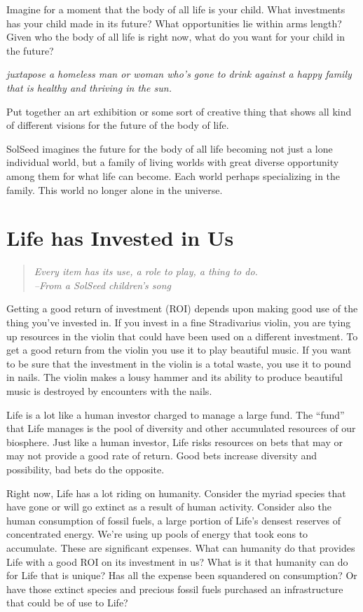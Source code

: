 \documentclass[ebook,11pt,openany,twoside]{memoir}
\newcommand{\tab}{\hspace*{2em}}
\newcommand{\imagefacingchapter}[1]{
  \cleartoverso
  \clearpage \null
  \thispagestyle{cleared}
  \AddToShipoutPictureBG*{%
    \AtStockLowerLeft{%
      \texttt{[image: \#1]}
    }
  }
  \clearpage
}
\begin{document}
Imagine for a moment that the body of all life is your child. What investments
has your child made in its future? What opportunities lie within arms length?
Given who the body of all life is right now, what do you want for your child in
the future?

{
\em
juxtapose a homeless man or woman who's gone to drink against a happy family
that is healthy and thriving in the sun.

Put together an art exhibition or some sort of creative thing that shows all
kind of different visions for the future of the body of life.

SolSeed imagines the future for the body of all life becoming not just a lone
individual world, but a family of living worlds with great diverse opportunity
among them for what life can become. Each world perhaps specializing in the
family. This world no longer alone in the universe.
}

\imagefacingchapter{images/ViolinMaker-cropped}
\chapter{Life has Invested in Us}

\begin{quote}
	\em
Every item has its use, a role to play, a thing to do. \\
\tab \tab --From a SolSeed children's song
\end{quote}

Getting a good return of investment (ROI) depends upon making good use of the
thing you've invested in. If you invest in a fine Stradivarius violin, you are
tying up resources in the violin that could have been used on a different
investment. To get a good return from the violin you use it to play beautiful
music. If you want to be sure that the investment in the violin is a total
waste, you use it to pound in nails. The violin makes a lousy hammer and its
ability to produce beautiful music is destroyed by encounters with the nails.

Life is a lot like a human investor charged to manage a large fund. The
``fund'' that Life manages is the pool of diversity and other accumulated
resources of our biosphere. Just like a human investor, Life risks resources on
bets that may or may not provide a good rate of return. Good bets increase
diversity and possibility, bad bets do the opposite.

Right now, Life has a lot riding on humanity. Consider the myriad species that
have gone or will go extinct as a result of human activity. Consider also the
human consumption of fossil fuels, a large portion of Life's densest reserves
of concentrated energy. We're using up pools of energy that took eons to
accumulate. These are significant expenses. What can humanity do that provides
Life with a good ROI on its investment in us? What is it that humanity can do
for Life that is unique? Has all the expense been squandered on consumption? Or
have those extinct species and precious fossil fuels purchased an
infrastructure that could be of use to Life?
\end{document}
